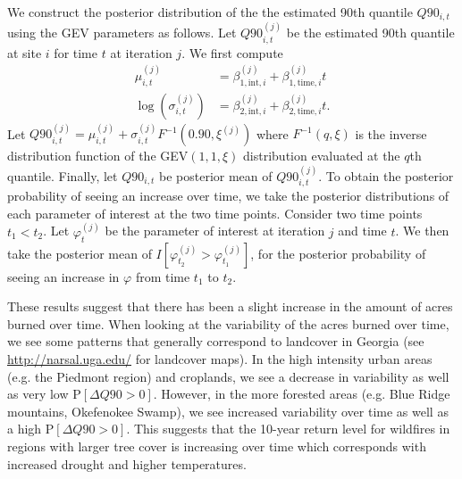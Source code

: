We construct the posterior distribution of the the estimated 90th quantile $Q90_{i, t}$ using the GEV parameters as follows.
Let $Q90_{i, t}^{(j)}$ be the estimated 90th quantile at site $i$ for time $t$ at iteration $j$.
We first compute
\begin{align}
  \mu_{i, t}^{(j)} &= \beta_{1, \text{int}, i}^{(j)} + \beta_{1, \text{time}, i}^{(j)} t \\
  \log\left(\sigma_{i, t}^{(j)}\right) &= \beta_{2, \text{int}, i}^{(j)} + \beta_{2, \text{time}, i}^{(j)} t. \nonumber
\end{align}
Let $Q90_{i, t}^{(j)} = \mu_{i, t}^{(j)} + \sigma_{i, t}^{(j)} F^{-1}\left(0.90, \xi^{(j)}\right)$ where $F^{-1}(q, \xi)$ is the inverse distribution function of the GEV$(1, 1, \xi)$ distribution evaluated at the $q$th quantile.
Finally, let $Q90_{i, t}$ be posterior mean of $Q90_{i, t}^{(j)}$.
To obtain the posterior probability of seeing an increase over time, we take the posterior distributions of each parameter of interest at the two time points.
Consider two time points $t_1 < t_2$.
Let $\varphi_t^{(j)}$ be the parameter of interest at iteration $j$ and time $t$.
We then take the posterior mean of $I\left[\varphi_{t_2}^{(j)} > \varphi_{t_1}^{(j)}\right]$, for the posterior probability of seeing an increase in $\varphi$ from time $t_1$ to $t_2$.

These results suggest that there has been a slight increase in the amount of acres burned over time.
When looking at the variability of the acres burned over time, we see some patterns that generally correspond to landcover in Georgia (see \url{http://narsal.uga.edu/} for landcover maps).
In the high intensity urban areas (e.g. the Piedmont region) and croplands, we see a decrease in variability as well as very low P$[\Delta Q90 > 0]$.
However, in the more forested areas (e.g. Blue Ridge mountains, Okefenokee Swamp), we see increased variability over time as well as a high P$[\Delta Q90 > 0]$.
This suggests that the 10-year return level for wildfires in regions with larger tree cover is increasing over time which corresponds with increased drought and higher temperatures.


